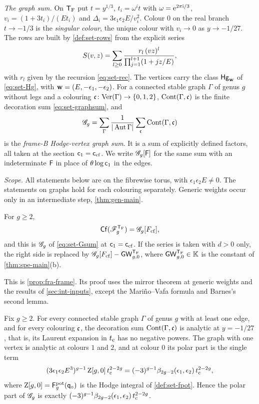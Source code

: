 \emph{The graph sum.} On $\mathsf{T}_{\mathrm{F}}$ put $t=y^{1/3}$, $t_i=\omega^it$ with $\omega=\mathrm{e}^{2\pi\mathrm{i}/3}$, $v_i=(1+3t_i)/(Et_i)$ and $\Delta_i=3\epsilon_1\epsilon_2E/v_i^2$. Colour $0$ on the real branch $t\to-1/3$ is the \emph{singular colour}, the unique colour with $v_i\to 0$ as $y\to-1/27$. The rows are built by \cref{def:set-rows} from the explicit series
\[
S(v,z)=\sum_{l\geq0}\frac{r_l\,(vz)^l}{\prod_{j=1}^{l+1}(1+jz/E)},
\]
with $r_l$ given by the recursion \eqref{eq:set-rec}. The vertices carry the class $\mathsf{Hg}_{\mathbf{w}}$ of \eqref{eq:set-Hg}, with $\mathbf{w}=(E,-\epsilon_1,-\epsilon_2)$. For a connected stable graph $\Gamma$ of genus $g$ without legs and a colouring $\mathfrak{c}\colon\mathrm{Ver}(\Gamma)\to\{0,1,2\}$, $\mathrm{Cont}(\Gamma,\mathfrak{c})$ is the finite decoration sum \eqref{eq:set-graphsum}, and
\[
\mathscr{G}_g=\sum_{\Gamma}\frac{1}{|\operatorname{Aut}\Gamma|}\sum_{\mathfrak{c}}\mathrm{Cont}(\Gamma,\mathfrak{c})
\]
is the \emph{frame-B Hodge-vertex graph sum}. It is a sum of explicitly defined factors, all taken at the section $\mathsf{c}_{1}=\mathsf{c}_{\mathrm{cf}}$. We write $\mathscr{G}_g[\mathsf{F}]$ for the same sum with an indeterminate $\mathsf{F}$ in place of $\theta\log\mathsf{c}_{1}$ in the edges.

\emph{Scope.} All statements below are on the fibrewise torus, with $\epsilon_1\epsilon_2E\neq 0$. The statements on graphs hold for each colouring separately. Generic weights occur only in an intermediate step, \cref{thm:gen-main}.

\begin{thm}
\label{thm:int-frame}
For $g\geq 2$,
\[
\mathsf{Cf}(\mathscr{F}_g^{\mathsf{T}_{\mathrm{F}}})=\mathscr{G}_g[F_{\mathrm{cf}}],
\]
and this is $\mathscr{G}_g$ of \eqref{eq:set-Gsum} at $\mathsf{c}_{1}=\mathsf{c}_{\mathrm{cf}}$. If the series is taken with $d>0$ only, the right side is replaced by $\mathscr{G}_g[F_{\mathrm{cf}}]-\mathsf{GW}_{g,0}^{\mathsf{T}_{\mathrm{F}}}$, where $\mathsf{GW}_{g,0}^{\mathsf{T}_{\mathrm{F}}}\in\mathbb{K}$ is the constant of \cref{thm:spe-main}\textup{(b)}.
\end{thm}

This is \cref{prop:fra-frame}. Its proof uses the mirror theorem \cite[Theorem~31]{CCIT15} at generic weights and the results of \cref{sec:int-inputs}, except the Mari\~no--Vafa formula and Barnes's second lemma.

\begin{thm}
\label{thm:int-regularity}
Fix $g\geq 2$. For every connected stable graph $\Gamma$ of genus $g$ with at least one edge, and for every colouring $\mathfrak{c}$, the decoration sum $\mathrm{Cont}(\Gamma,\mathfrak{c})$ is analytic at $y=-1/27$, that is, its Laurent expansion in $t_{\mathrm{c}}$ has no negative powers. The graph with one vertex is analytic at colours $1$ and $2$, and at colour $0$ its polar part is the single term
\[
(3\epsilon_1\epsilon_2E^3)^{g-1}\,\mathrm{Z}[g,0]\,t_{\mathrm{c}}^{2-2g}=(-3)^{g-1}\beta_{2g-2}(\epsilon_1,\epsilon_2)\,t_{\mathrm{c}}^{2-2g},
\]
where $\mathrm{Z}[g,0]=\mathsf{F}^{\mathrm{pot}}_g(\mathsf{q}_{\circ})$ is the Hodge integral of \cref{def:set-fpot}. Hence the polar part of $\mathscr{G}_g$ is exactly $(-3)^{g-1}\beta_{2g-2}(\epsilon_1,\epsilon_2)\,t_{\mathrm{c}}^{2-2g}$.
\end{thm}

